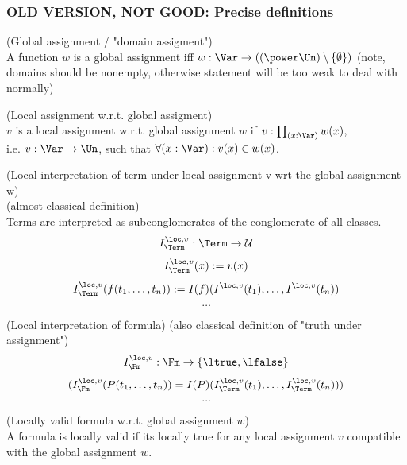 \subsubsection{OLD VERSION, NOT GOOD: Precise definitions}
\begin{definition}(Global assignment / "domain assigment")\\
A function $w$ is a global assignment iff
$w:\Var\to((\power\Un)\setminus\{\emptyset\})$
(note, domains should be nonempty, otherwise statement will be too weak to deal with normally)
\end{definition}
\begin{definition}(Local assignment w.r.t. global assigment)\\
$v$ is a local assignment w.r.t. global assignment $w$ if $v:\prod_{(x:\Var)}w(x)$,\\
i.e. $v:\Var\to\Un$, such that $\forall (x:\Var) : v(x) \in w(x)$.\\
\end{definition}
\begin{definition}(Local interpretation of term under local assignment v wrt the global assignment w)\\
(almost classical definition)\\%
Terms are interpreted as subconglomerates of the conglomerate of all classes.
\[
I^{\loc,v}_\Term : \Term \to \mathcal{U}
\]
\[
I^{\loc,v}_\Term(x) := v(x)
\]
\[
I^{\loc,v}_\Term(f(t_1,\dots,t_n)) := I(f)(I^{\loc,v}(t_1),\dots,I^{\loc,v}(t_n))
\]
\[
\dots
\]
\end{definition}
\begin{definition}(Local interpretation of formula)
(also classical definition of "truth under assignment")
\[
I^{\loc,v}_\Fm : \Fm \to \{\ltrue, \lfalse\}
\]
\[
(I^{\loc,v}_\Fm(P(t_1,\dots,t_n))=I(P)(I^{\loc,v}_\Term(t_1),\dots,I^{\loc,v}_\Term(t_n)))
\]
\[
\dots
\]

\end{definition}
\begin{definition}(Locally valid formula w.r.t. global assignment $w$)\\
A formula is locally valid if its locally true for any local assignment $v$ compatible with the global assignment $w$.
\end{definition}
